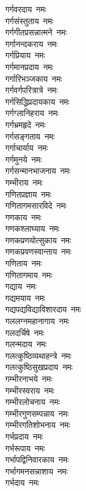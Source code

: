 \begin{multicols}{2}
\begin{flushleft}
गर्गवरदाय~नमः\\
गर्गसंस्तुताय~नमः\\
गर्गगीतप्रसन्नात्मने~नमः\\
गर्गानन्दकराय~नमः\\
गर्गप्रियाय~नमः\\
गर्गमानप्रदाय~नमः\\
गर्गारिभञ्जकाय~नमः\\
गर्गवर्गपरित्रात्रे~नमः\\
गर्गसिद्धिप्रदायकाय~नमः\\
गर्गग्लानिहराय~नमः\hfill{}\\
गर्गभ्रमहृदे~नमः\\
गर्गसङ्गताय~नमः\\
गर्गाचार्याय~नमः\\
गर्गमुनये~नमः\\
गर्गसन्मानभाजनाय~नमः\\
गम्भीराय~नमः\\
गणितप्रज्ञाय~नमः\\
गणितागमसारविदे~नमः\\
गणकाय~नमः\\
गणकश्लाघ्याय~नमः\hfill{}\\
गणकप्रणयोत्सुकाय~नमः\\
गणकप्रवणस्वान्ताय~नमः\\
गणिताय~नमः\\
गणितागमाय~नमः\\
गद्याय~नमः\\
गद्यमयाय~नमः\\
गद्यपद्यविद्याविशारदाय~नमः\\
गललग्नमहानागाय~नमः\\
गलदर्चिषे~नमः\\
गलन्मदाय~नमः\hfill{}\\
गलत्कुष्ठिव्यथाहन्त्रे~नमः\\
गलत्कुष्ठिसुखप्रदाय~नमः\\
गम्भीरनाभये~नमः\\
गम्भीरस्वराय~नमः\\
गम्भीरलोचनाय~नमः\\
गम्भीरगुणसम्पन्नाय~नमः\\
गम्भीरगतिशोभनाय~नमः\\
गर्भप्रदाय~नमः\\
गर्भरूपाय~नमः\\
गर्भापद्विनिवारकाय~नमः\hfill{}\\
गर्भागमनसन्नाशाय~नमः\\
गर्भदाय~नमः\\

\end{flushleft}
\end{multicols}
